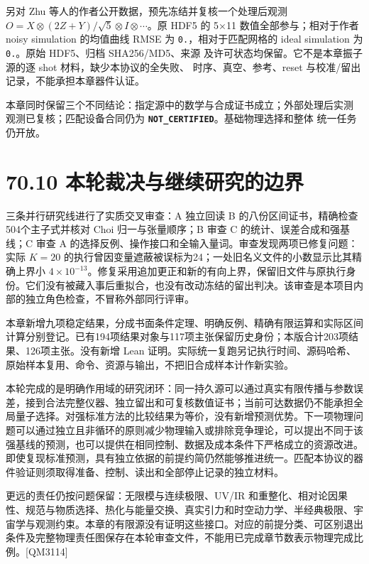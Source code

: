 \documentclass[
  11pt,
  oneside]{book}
\begin{document}
另对 Zhu 等人的作者公开数据，预先冻结并复核一个处理后观测
\(O=X\otimes(2Z+Y)/\sqrt5\otimes I\otimes\cdots\)。原 HDF5 的 5×11
数值全部参与；相对于作者 noisy simulation 的均值曲线 RMSE 为
\texttt{0.}，相对于匹配网格的 ideal simulation 为
\texttt{0.}。原始 HDF5、归档 SHA256/MD5、来源
及许可状态均保留。它不是本章振子源的逐 shot 材料，缺少本协议的全失败、
时序、真空、参考、reset 与校准/留出记录，不能承担本章器件认证。

本章同时保留三个不同结论：指定源中的数学与合成证书成立；外部处理后实测
观测已复核；匹配设备合同仍为
\textbf{\texttt{NOT\_\allowbreak CERTIFIED}}。基础物理选择和整体 统一任务仍开放。

\section{70.10 本轮裁决与继续研究的边界}

三条并行研究线进行了实质交叉审查：A 独立回读 B
的八份区间证书，精确检查504个主子式并核对 Choi 归一与张量顺序；B 审查 C
的统计、误差合成和强基线；C 审查 A
的选择反例、操作接口和全输入量词。审查发现两项已修复问题：实际 \(K=20\)
的执行曾因变量遮蔽被误标为24；一处旧名义文件的小数显示比其精确上界小
\(4\times10^{-13}\)。修复采用追加更正和新的有向上界，保留旧文件与原执行身份。它们没有被藏入事后重拟合，也没有改动冻结的留出判决。该审查是本项目内部的独立角色检查，不冒称外部同行评审。

本章新增九项稳定结果，分成书面条件定理、明确反例、精确有限运算和实际区间计算分别登记。已有194项结果对象与117项主张保留历史身份；本版合计203项结果、126项主张。没有新增
Lean
证明。实际统一复跑另记执行时间、源码哈希、原始样本复用、命令、资源与输出，不把旧合成样本计作新实验。

本轮完成的是明确作用域的研究闭环：同一持久源可以通过真实有限传播与参数误差，接到合法完整仪器、独立留出和可复核数值证书；当前可达数据仍不能承担全局量子选择。对强标准方法的比较结果为等价，没有新增预测优势。下一项物理问题可以通过独立且非循环的原则减少物理输入或排除竞争理论，可以提出不同于该强基线的预测，也可以提供在相同控制、数据及成本条件下严格成立的资源改进。即使复现标准预测，具有独立依据的前提约简仍然能够推进统一。匹配本协议的器件验证则须取得准备、控制、读出和全部停止记录的独立材料。

更远的责任仍按问题保留：无限模与连续极限、UV/IR
和重整化、相对论因果性、规范与物质选择、热化与能量交换、真实引力和时空动力学、半经典极限、宇宙学与观测约束。本章的有限源没有证明这些接口。对应的前提分类、可区别退出条件及完整物理责任图保存在本轮审查文件，不能用已完成章节数表示物理完成比例。{[}QM3114{]}
\end{document}
